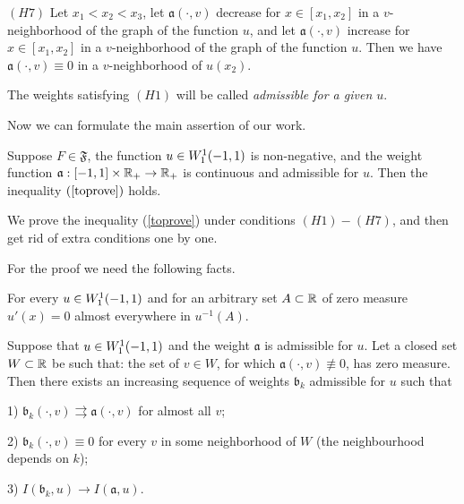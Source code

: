 \bigskip
\noindent
$(H7)$ Let $x_1 < x_2 < x_3$,
let $\mathfrak a(\cdot, v)$ decrease for $x \in [x_1, x_2]$ in a $v$-neighborhood of the graph of the function $u$,
and let $\mathfrak a(\cdot, v)$ increase for $x \in [x_1, x_2]$ in a $v$-neighborhood of the graph of the function $u$.
Then we have $\mathfrak a(\cdot, v) \equiv 0$ in a $v$-neighborhood of $u(x_2)$.

\bigskip

The weights satisfying $(H1)$ will be called {\it admissible for a given $u$}.

\medskip

Now we can formulate the main assertion of our work.
\begin{thm}
\label{mainThm}
Suppose $F \in \mathfrak{F}$, the function $u \in W_1^1(-1, 1)$ is non-negative,
and the weight function $\mathfrak a: [-1, 1] \times \mathbb R_+ \to \mathbb R_+$ is continuous
and admissible for $u$.
Then the inequality $(\ref{toprove})$ holds.
\end{thm}

We prove the inequality (\ref{toprove}) under conditions $(H1)-(H7)$,
and then get rid of extra conditions one by one.

For the proof we need the following facts.

\begin{prop}
\label{levelDerivative}
{\rm \cite[Theorem 6.19]{LL} }
For every $u \in W_1^1(-1, 1)$ and for an arbitrary set $A \subset \mathbb R$ of zero measure
$u'(x) = 0$ almost everywhere in $u^{-1}(A)$.
\end{prop}

\begin{lm}
\label{zeroApprox}
Suppose that $u \in W_1^1(-1, 1)$ and the weight $\mathfrak a$ is admissible for $u$.
Let a closed set $W \subset \mathbb R$ be such that:
the set of $v \in W$, for which $\mathfrak a(\cdot, v) \not\equiv 0$, has zero measure.
Then there exists an increasing sequence of weights $\mathfrak b_k$ admissible for $u$ such that

1) $\mathfrak b_k(\cdot, v) \rightrightarrows \mathfrak a(\cdot, v)$ for almost all $v$;

2) $\mathfrak b_k(\cdot, v) \equiv 0$ for every $v$ in some neighborhood of $W$ (the neighbourhood depends on $k$);

3) $I(\mathfrak b_k, u) \to I(\mathfrak a, u)$.
\end{lm}

